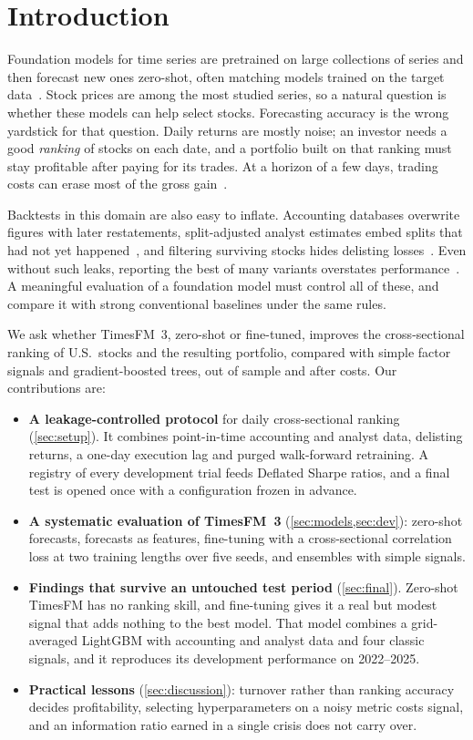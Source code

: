 \section{Introduction}
\label{sec:intro}

Foundation models for time series are pretrained on large collections of series and then forecast new ones zero-shot, often matching models trained on the target data~\cite{das2024timesfm,ansari2024chronos,woo2024moirai,rasul2023lagllama}.
Stock prices are among the most studied series, so a natural question is whether these models can help select stocks.
Forecasting accuracy is the wrong yardstick for that question.
Daily returns are mostly noise; an investor needs a good \emph{ranking} of stocks on each date, and a portfolio built on that ranking must stay profitable after paying for its trades.
At a horizon of a few days, trading costs can erase most of the gross gain~\cite{novymarx2016taxonomy}.

Backtests in this domain are also easy to inflate.
Accounting databases overwrite figures with later restatements, split-adjusted analyst estimates embed splits that had not yet happened~\cite{payne2003ibes}, and filtering surviving stocks hides delisting losses~\cite{shumway1997delisting}.
Even without such leaks, reporting the best of many variants overstates performance~\cite{bailey2014deflated,harvey2016cross}.
A meaningful evaluation of a foundation model must control all of these, and compare it with strong conventional baselines under the same rules.

We ask whether TimesFM~3, zero-shot or fine-tuned, improves the cross-sectional ranking of U.S.\ stocks and the resulting portfolio, compared with simple factor signals and gradient-boosted trees, out of sample and after costs.
Our contributions are:
\begin{itemize}
\item \textbf{A leakage-controlled protocol} for daily cross-sectional ranking (\cref{sec:setup}).
It combines point-in-time accounting and analyst data, delisting returns, a one-day execution lag and purged walk-forward retraining.
A registry of every development trial feeds Deflated Sharpe ratios, and a final test is opened once with a configuration frozen in advance.
\item \textbf{A systematic evaluation of TimesFM~3} (\cref{sec:models,sec:dev}): zero-shot forecasts, forecasts as features, fine-tuning with a cross-sectional correlation loss at two training lengths over five seeds, and ensembles with simple signals.
\item \textbf{Findings that survive an untouched test period} (\cref{sec:final}).
Zero-shot TimesFM has no ranking skill, and fine-tuning gives it a real but modest signal that adds nothing to the best model.
That model combines a grid-averaged LightGBM with accounting and analyst data and four classic signals, and it reproduces its development performance on 2022--2025.
\item \textbf{Practical lessons} (\cref{sec:discussion}): turnover rather than ranking accuracy decides profitability, selecting hyperparameters on a noisy metric costs signal, and an information ratio earned in a single crisis does not carry over.
\end{itemize}
